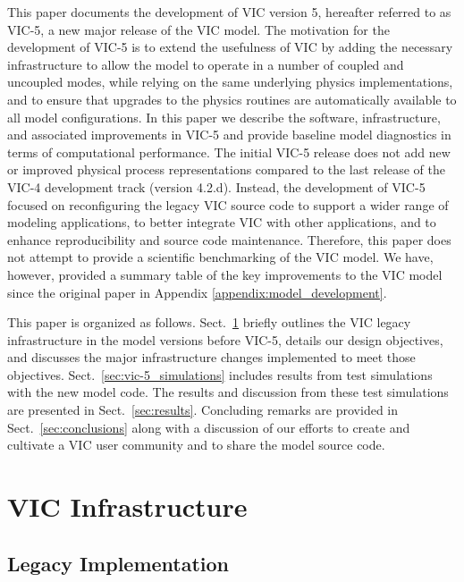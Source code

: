 \documentclass[gmd, manuscript]{copernicus}
\begin{document}
  This paper documents the development of VIC version 5, hereafter referred to as VIC-5, a new major release of the VIC model. The motivation for the development of VIC-5 is to extend the usefulness of VIC by adding the necessary infrastructure to allow the model to operate in a number of coupled and uncoupled modes, while relying on the same underlying physics implementations, and to ensure that upgrades to the physics routines are automatically available to all model configurations. In this paper we describe the software, infrastructure, and associated improvements in VIC-5 and provide baseline model diagnostics in terms of computational performance. The initial VIC-5 release does not add new or improved physical process representations compared to the last release of the VIC-4 development track (version 4.2.d). Instead, the development of VIC-5 focused on reconfiguring the legacy VIC source code to support a wider range of modeling applications, to better integrate VIC with other applications, and to enhance reproducibility and source code maintenance. Therefore, this paper does not attempt to provide a scientific benchmarking of the VIC model. We have, however, provided a summary table of the key improvements to the VIC model since the original \citet{Liang_1994} paper in Appendix \ref{appendix:model_development}.

  This paper is organized as follows. Sect.~\ref{sec:vic_infrastructure} briefly outlines the VIC legacy infrastructure in the model versions before VIC-5, details our design objectives, and discusses the major infrastructure changes implemented to meet those objectives. Sect.~\ref{sec:vic-5_simulations} includes results from test simulations with the new model code. The results and discussion from these test simulations are presented in Sect.~\ref{sec:results}. Concluding remarks are provided in Sect.~\ref{sec:conclusions} along with a discussion of our efforts to create and cultivate a VIC user community and to share the model source code.

\section{VIC Infrastructure}
  \label{sec:vic_infrastructure}
  \subsection{Legacy Implementation}
    \label{sec:vic_legacy}
\end{document}
